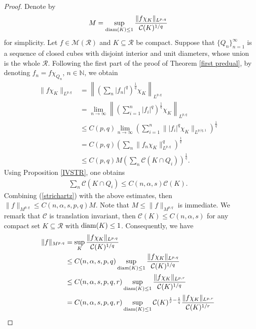 \documentclass[10pt,reqno]{amsart}
\numberwithin{equation}{section}
\begin{document}
\begin{proof}
Denote by
\begin{align*}
M=\sup_{{\rm diam}(K)\leq 1}\frac{\|f\chi_{K}\|_{L^{p,q}}}{\mathcal{C}(K)^{1/q}}
\end{align*}
for simplicity. Let $f\in\mathcal{M}(\mathcal{R})$ and $K\subseteq\mathcal{R}$ be compact. Suppose that $\{Q_{n}\}_{n=1}^{\infty}$ is a sequence of closed cubes with disjoint interior and unit diameters, whose union is the whole $\mathcal{R}$. Following the first part of the proof of Theorem \ref{first predual}, by denoting $f_{n}=f\chi_{Q_{n}}$, $n\in\mathbb{N}$, we obtain
\begin{align*}
\|f\chi_{K}\|_{L^{p,q}}&=\left\|\left(\sum_{n}|f_{n}|^{q}\right)^{\frac{1}{q}}\chi_{K}\right\|_{L^{p,q}}\\
&=\lim_{n\rightarrow\infty}\left\|\left(\sum_{i=1}^{n}|f_{i}|^{q}\right)^{\frac{1}{q}}\chi_{K}\right\|_{L^{p,q}}\\
&\leq C(p,q)\lim_{n\rightarrow\infty}\left(\sum_{i=1}^{n}\||f_{i}|^{q}\chi_{K}\|_{L^{p/q,1}}\right)^{\frac{1}{q}}\\
&=C(p,q)\left(\sum_{n}\|f_{n}\chi_{K}\|_{L^{p,q}}^{q}\right)^{\frac{1}{q}}\\
&\leq C(p,q)M\left(\sum_{n}\mathcal{C}(K\cap Q_{i})\right)^{\frac{1}{q}}.
\end{align*}
Using Proposition \ref{IVSTR}, one obtains
\begin{align}\label{strichartz}
\sum_{n}\mathcal{C}(K\cap Q_{i})\leq C(n,\alpha,s)\mathcal{C}(K).
\end{align}
Combining (\ref{strichartz}) with the above estimates, then $\|f\|_{M^{p,q}}\leq C(n,\alpha,s,p,q)M$. Note that $M\leq\|f\|_{M^{p,q}}$ is immediate. We remark that $\mathcal{C}$ is translation invariant, then $\mathcal{C}(K)\leq C(n,\alpha,s)$ for any compact set $K\subseteq\mathcal{R}$ with ${\rm diam}(K)\leq 1$. Consequently, we have
\begin{align*}
\|f\|_{M^{p,q}}&=\sup_{K}\frac{\|f\chi_{K}\|_{L^{p,q}}}{\mathcal{C}(K)^{1/q}}\\
&\leq C(n,\alpha,s,p,q)\sup_{{\rm diam}(K)\leq 1}\frac{\|f\chi_{K}\|_{L^{p,q}}}{\mathcal{C}(K)^{1/q}}\\
&\leq C(n,\alpha,s,p,q,r)\sup_{{\rm diam}(K)\leq 1}\frac{\|f\chi_{K}\|_{L^{p,r}}}{\mathcal{C}(K)^{1/q}}\\
&=C(n,\alpha,s,p,q,r)\sup_{{\rm diam}(K)\leq 1}\mathcal{C}(K)^{\frac{1}{r}-\frac{1}{q}}\frac{\|f\chi_{K}\|_{L^{p,r}}}{\mathcal{C}(K)^{1/r}}\\

\end{align*}
\end{proof}
\end{document}
